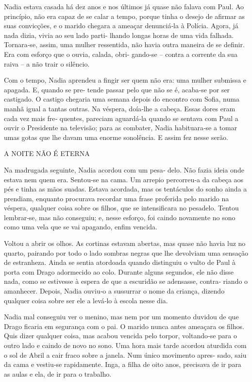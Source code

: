 Nadia estava casada há dez anos e nos últimos já quase não falava com
Paul. Ao princípio, não era capaz de se calar a tempo, porque tinha o
desejo de afirmar as suas convicções, e o marido chegara a ameaçar
denunciá‑la à Polícia. Agora, já nada dizia, vivia ao seu lado parti‑
lhando longas horas de uma vida falhada. Tornara‑se, assim, uma mulher
ressentida, não havia outra maneira de se definir. Era com esforço que o
ouvia, calada, obri‑ gando‑se -- contra a corrente da sua raiva -- a não
trair o silêncio.

Com o tempo, Nadia aprendeu a fingir ser quem não era: uma mulher
submissa e apagada. E, quando se pre‑ tende passar pelo que não se é,
acaba‑se por ser castigado. O castigo chegaria uma semana depois do
encontro com Sofia, numa manhã igual a tantas outras. Na véspera,
doía‑lhe a cabeça. Essas dores eram cada vez mais fre‑ quentes, pareciam
aguardá‑la quando se sentava com Paul a ouvir o Presidente na televisão;
para as combater, Nadia habituara‑se a tomar umas gotas que lhe davam
uma enorme sonolência. E assim fez nesse serão.

A NOITE NÃO É ETERNA

Na madrugada seguinte, Nadia acordou com um pesa‑ delo. Não fazia ideia
onde estava nem quem era. Sentou‑se na cama. Um arrepio percorreu‑a da
cabeça aos pés e tinha as mãos suadas. Estava acordada, mas os
tentáculos do sonho ainda a prendiam, enquanto procurava recordar uma
frase proferida pelo marido na véspera, qualquer coisa sobre os filhos,
que se intensificara no pesadelo. Tentou lembrar‑se, mas não conseguiu;
e, nesse esforço, foi caindo novamente no sono como uma vela que se vai
apagando, enfim vencida.

Voltou a abrir os olhos. As cortinas estavam abertas, mas quase não
havia luz no quarto, pairando por todo o lado sombras negras que lhe
devolviam uma sensação de estranheza. Ainda se sentia atordoada quando
distinguiu o vulto de Paul à porta com Drago adormecido ao colo. Durante
alguns segundos, ele não disse nada, como se estivesse à espera de que a
escuridão se adensasse, contra‑ riando o amanhecer. Depois, Nadia
ouviu‑o a sussurrar o nome da criança, dizendo qualquer coisa sobre ser
ele a levá‑lo à escola nesse dia.

Nadia mal conseguiu ver o menino, mas nem por um momento duvidou de que
Drago ficaria em segurança com o pai. O marido nunca antes ameaçara os
filhos. Quis dizer qualquer coisa, mas acabou vencida pelo torpor,
voltando‑se para o outro lado e caindo de novo no sono. Uma hora mais
tarde acordou aturdida com o sol de Abril a cair fraco sobre a janela.
Num único movimento apres‑ sado, saiu da cama e vestiu‑se rapidamente.
Inga, a filha de oito anos, precisava de ir para as aulas e ela, de ir
para o trabalho.

